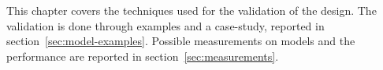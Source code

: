 This chapter covers the techniques used for the validation of the design. The validation is done through examples and a case-study, reported in section~\ref{sec:model-examples}. Possible measurements on models and the performance are reported in section~\ref{sec:measurements}.

